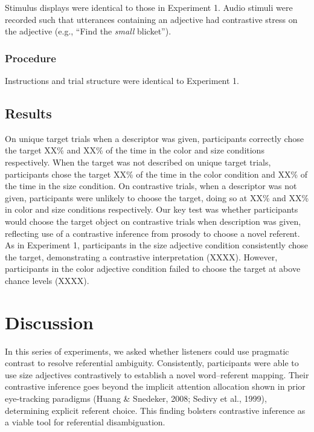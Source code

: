 \documentclass[10pt, letterpaper]{article}
\begin{document}
Stimulus displays were identical to those in Experiment 1. Audio stimuli
were recorded such that utterances containing an adjective had
contrastive stress on the adjective (e.g., ``Find the \emph{small}
blicket'').

\hypertarget{procedure-1}{%
\subsubsection{Procedure}\label{procedure-1}}

Instructions and trial structure were identical to Experiment 1.

\hypertarget{results-2}{%
\subsection{Results}\label{results-2}}

On unique target trials when a descriptor was given, participants
correctly chose the target XX\% and XX\% of the time in the color and
size conditions respectively. When the target was not described on
unique target trials, participants chose the target XX\% of the time in
the color condition and XX\% of the time in the size condition. On
contrastive trials, when a descriptor was not given, participants were
unlikely to choose the target, doing so at XX\% and XX\% in color and
size conditions respectively. Our key test was whether participants
would choose the target object on contrastive trials when description
was given, reflecting use of a contrastive inference from prosody to
choose a novel referent. As in Experiment 1, participants in the size
adjective condition consistently chose the target, demonstrating a
contrastive interpretation (XXXX). However, participants in the color
adjective condition failed to choose the target at above chance levels
(XXXX).

\hypertarget{discussion}{%
\section{Discussion}\label{discussion}}

In this series of experiments, we asked whether listeners could use
pragmatic contrast to resolve referential ambiguity. Consistently,
participants were able to use size adjectives contrastively to establish
a novel word--referent mapping. Their contrastive inference goes beyond
the implicit attention allocation shown in prior eye-tracking paradigms
(Huang \& Snedeker, 2008; Sedivy et al., 1999), determining explicit
referent choice. This finding bolsters contrastive inference as a viable
tool for referential disambiguation.
\end{document}
